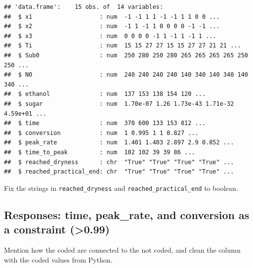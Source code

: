 \documentclass[
]{article}
\newenvironment{Shaded}{\begin{snugshade}}{\end{snugshade}}
\newcommand{\FunctionTok}[1]{\textcolor[rgb]{0.13,0.29,0.53}{\textbf{#1}}}
\newcommand{\NormalTok}[1]{#1}
\newcommand{\OtherTok}[1]{\textcolor[rgb]{0.56,0.35,0.01}{#1}}
\newcommand{\SpecialCharTok}[1]{\textcolor[rgb]{0.81,0.36,0.00}{\textbf{#1}}}
\begin{document}
\begin{verbatim}
## 'data.frame':    15 obs. of  14 variables:
##  $ x1                   : num  -1 -1 1 1 -1 -1 1 1 0 0 ...
##  $ x2                   : num  -1 1 -1 1 0 0 0 0 -1 -1 ...
##  $ x3                   : num  0 0 0 0 -1 1 -1 1 -1 1 ...
##  $ Ti                   : num  15 15 27 27 15 15 27 27 21 21 ...
##  $ Sub0                 : num  250 280 250 280 265 265 265 265 250 250 ...
##  $ N0                   : num  240 240 240 240 140 340 140 340 140 340 ...
##  $ ethanol              : num  137 153 138 154 120 ...
##  $ sugar                : num  1.70e-07 1.26 1.73e-43 1.71e-32 4.59e+01 ...
##  $ time                 : num  370 600 133 153 812 ...
##  $ conversion           : num  1 0.995 1 1 0.827 ...
##  $ peak_rate            : num  1.401 1.403 2.897 2.9 0.852 ...
##  $ time_to_peak         : num  102 102 39 39 86 ...
##  $ reached_dryness      : chr  "True" "True" "True" "True" ...
##  $ reached_practical_end: chr  "True" "True" "True" "True" ...
\end{verbatim}

Fix the strings in \texttt{reached\_dryness} and
\texttt{reached\_practical\_end} to boolean.

\begin{Shaded}
\end{Shaded}

\subsection{Responses: time, peak\_rate, and conversion as a constraint
(\textgreater0.99)}\label{responses-time-peak_rate-and-conversion-as-a-constraint-0.99}

Mention how the coded are connected to the not coded, and clean the
column with the coded values from Python.
\end{document}
